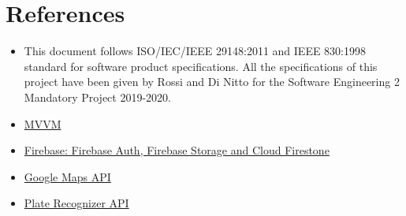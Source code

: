 \documentclass[../RASD.tex]{subfiles}
\begin{document}
\chapter{References}\label{ch:references}
    \begin{itemize}
        \item This document follows ISO/IEC/IEEE 29148:2011 and IEEE 830:1998 standard for software product specifications.
        All the specifications of this project have been given by Rossi and Di Nitto for the Software Engineering 2 Mandatory Project 2019-2020.
        \item \href{https://it.wikipedia.org/wiki/Model-view-viewmodel}{MVVM}
        \item \href{https://firebase.google.com/docs}{Firebase: Firebase Auth, Firebase Storage and Cloud Firestone}
        \item \href{https://developers.google.com/maps/documentation/}{Google Maps API}
        \item \href{http://docs.platerecognizer.com/}{Plate Recognizer API}
    \end{itemize}
\end{document}
